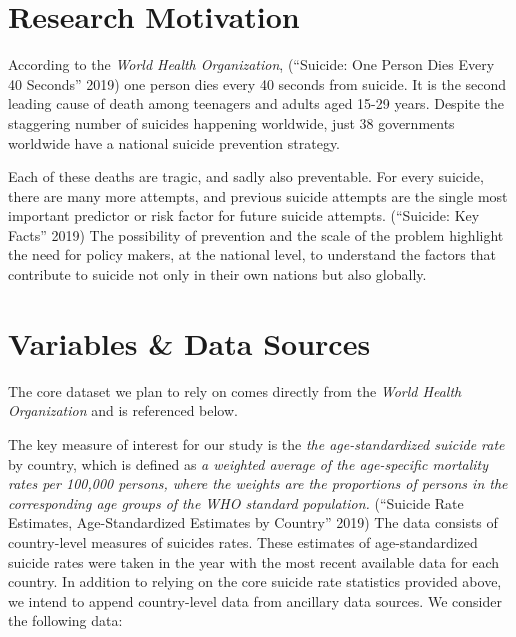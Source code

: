 \documentclass[]{article}
\begin{document}
\section{Research Motivation}\label{research-motivation}

According to the \emph{World Health Organization}, (``Suicide: One
Person Dies Every 40 Seconds'' 2019) one person dies every 40 seconds
from suicide. It is the second leading cause of death among teenagers
and adults aged 15-29 years. Despite the staggering number of suicides
happening worldwide, just 38 governments worldwide have a national
suicide prevention strategy.

Each of these deaths are tragic, and sadly also preventable. For every
suicide, there are many more attempts, and previous suicide attempts are
the single most important predictor or risk factor for future suicide
attempts. (``Suicide: Key Facts'' 2019) The possibility of prevention
and the scale of the problem highlight the need for policy makers, at
the national level, to understand the factors that contribute to suicide
not only in their own nations but also globally.

\section{Variables \& Data Sources}\label{variables-data-sources}

The core dataset we plan to rely on comes directly from the \emph{World
Health Organization} and is referenced below. 


The key measure of
interest for our study is the \emph{the age-standardized suicide rate}
by country, which is defined as \emph{a weighted average of the
age-specific mortality rates per 100,000 persons, where the weights are
the proportions of persons in the corresponding age groups of the WHO
standard population.} (``Suicide Rate Estimates, Age-Standardized
Estimates by Country'' 2019) The data consists of country-level measures
of suicides rates. These estimates of
age-standardized suicide rates were taken in the year with the most recent available data for each country.
In addition to
relying on the core suicide rate statistics provided above, we
intend to append country-level data
from ancillary data sources. We consider the following
data:
\end{document}
